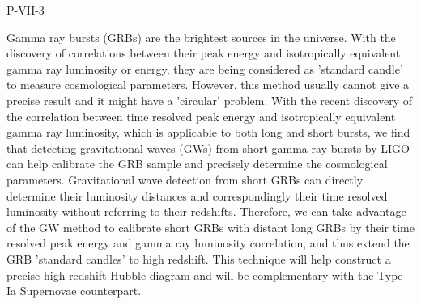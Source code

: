 P-VII-3


\bigskip



\bigskip

\noindent Gamma ray bursts (GRBs) are the brightest sources in the universe. With the discovery of correlations between their peak energy and isotropically equivalent gamma ray luminosity or energy, they are being considered as 'standard candle' to measure cosmological parameters. However, this method usually cannot give a precise result and it might have a 'circular' problem. With the recent discovery of the correlation between time resolved peak energy and isotropically equivalent gamma ray luminosity, which is applicable to both long and short bursts, we find that detecting gravitational waves (GWs) from short gamma ray bursts by LIGO can help calibrate the GRB sample and precisely determine the cosmological parameters. Gravitational wave detection from short GRBs can directly determine their luminosity distances and correspondingly their time resolved luminosity without referring to their redshifts. Therefore, we can take advantage of the GW method to calibrate short GRBs with distant long GRBs by their time resolved peak energy and gamma ray luminosity correlation, and thus extend the GRB 'standard candles' to high redshift. This technique will help construct a precise high redshift Hubble diagram and will be complementary with the Type Ia Supernovae counterpart.

